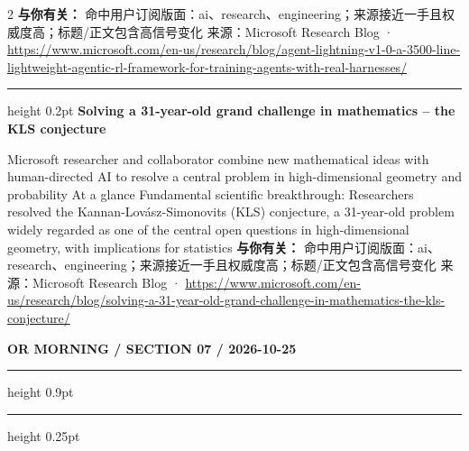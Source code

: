 \documentclass[10.5pt]{ctexart}
\begin{document}
\begin{multicols}{2}
\textbf{与你有关：} 命中用户订阅版面：ai、research、engineering；来源接近一手且权威度高；标题/正文包含高信号变化
{\footnotesize\color{ormuted} 来源：Microsoft Research Blog · \url{https://www.microsoft.com/en-us/research/blog/agent-lightning-v1-0-a-3500-line-lightweight-agentic-rl-framework-for-training-agents-with-real-harnesses/}}
\vspace{2mm}
\hrule height 0.2pt
\vspace{2mm}
{\large\bfseries Solving a 31-year-old grand challenge in mathematics – the KLS conjecture}\par
Microsoft researcher and collaborator combine new mathematical ideas with human-directed AI to resolve a central problem in high-dimensional geometry and probability At a glance Fundamental scientific breakthrough: Researchers resolved the Kannan-Lovász-Simonovits (KLS) conjecture, a 31-year-old problem widely regarded as one of the central open questions in high-dimensional geometry, with implications for statistics
\textbf{与你有关：} 命中用户订阅版面：ai、research、engineering；来源接近一手且权威度高；标题/正文包含高信号变化
{\footnotesize\color{ormuted} 来源：Microsoft Research Blog · \url{https://www.microsoft.com/en-us/research/blog/solving-a-31-year-old-grand-challenge-in-mathematics-the-kls-conjecture/}}
\end{multicols}
\newpage
{\small\bfseries OR MORNING / SECTION 07 / 2026-10-25}
\vspace{2mm}
\hrule height 0.9pt
\vspace{1.5mm}
\hrule height 0.25pt
\vspace{4mm}
\end{document}
